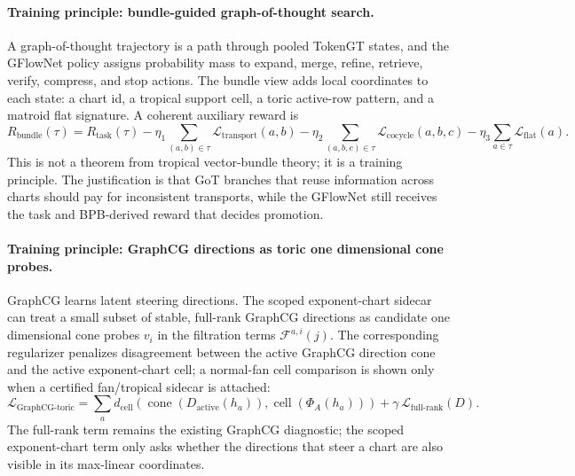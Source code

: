 \documentclass[11pt]{article}
\begin{document}
\paragraph{Training principle: bundle-guided graph-of-thought search.}
A graph-of-thought trajectory is a path through pooled TokenGT states, and the GFlowNet policy assigns probability mass to expand, merge, refine, retrieve, verify, compress, and stop actions.  The bundle view adds local coordinates to each state: a chart id, a tropical support cell, a toric active-row pattern, and a matroid flat signature.  A coherent auxiliary reward is
\[
  R_{\mathrm{bundle}}(\tau)=R_{\mathrm{task}}(\tau)-\eta_1\sum_{(a,b)\in\tau}\mathcal{L}_{\mathrm{transport}}(a,b)-\eta_2\sum_{(a,b,c)\in\tau}\mathcal{L}_{\mathrm{cocycle}}(a,b,c)-\eta_3\sum_{a\in\tau}\mathcal{L}_{\mathrm{flat}}(a).
\]
This is not a theorem from tropical vector-bundle theory; it is a training principle.  The justification is that GoT branches that reuse information across charts should pay for inconsistent transports, while the GFlowNet still receives the task and BPB-derived reward that decides promotion.

\paragraph{Training principle: GraphCG directions as toric one dimensional cone probes.}
GraphCG learns latent steering directions.  The scoped exponent-chart sidecar can treat a small subset of stable, full-rank GraphCG directions as candidate one dimensional cone probes $v_i$ in the filtration terms $\mathcal{F}^{a,i}(j)$.  The corresponding regularizer penalizes disagreement between the active GraphCG direction cone and the active exponent-chart cell; a normal-fan cell comparison is shown only when a certified fan/tropical sidecar is attached:
\[
  \mathcal{L}_{\mathrm{GraphCG\mbox{-}toric}}=\sum_a d_{\mathrm{cell}}\left(\operatorname{cone}(D_{\mathrm{active}}(h_a)),\operatorname{cell}(\Phi_A(h_a))\right)+\gamma\,\mathcal{L}_{\mathrm{full\mbox{-}rank}}(D).
\]
The full-rank term remains the existing GraphCG diagnostic; the scoped exponent-chart term only asks whether the directions that steer a chart are also visible in its max-linear coordinates.
\end{document}

